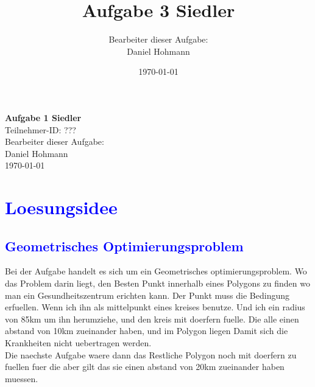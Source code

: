 \documentclass{article}
\title{\Huge{\textbf{Aufgabe 3 Siedler}} \\ \centering{\LARGE{Teilnahme-ID: ?????}}}
\author{Bearbeiter dieser Aufgabe: \\ Daniel Hohmann}
\date{\today}
\begin{document}
\thispagestyle{empty}
\begin{center}
\Huge{\textbf{Aufgabe 1 Siedler}}
\\
\LARGE{Teilnehmer-ID: ???}
\\
\LARGE{Bearbeiter dieser Aufgabe: \\ Daniel Hohmann}
\\
\LARGE{\today}
\end{center}
\newpage
\setcounter{page}{1}
\tableofcontents
\newpage
\section{\textcolor{blue}{Loesungsidee}}
\subsection{\textcolor{blue}{Geometrisches Optimierungsproblem}}
Bei der Aufgabe handelt es sich um ein Geometrisches optimierungsproblem. Wo das Problem darin liegt, den Besten Punkt innerhalb eines Polygons zu finden wo man ein Gesundheitszentrum erichten kann. Der Punkt muss die Bedingung erfuellen. Wenn ich ihn als mittelpunkt eines kreises benutze. Und ich ein radius von 85km um ihn herumziehe, und den kreis mit doerfern fuelle. Die alle einen abstand von 10km zueinander haben, und im Polygon liegen Damit sich die Krankheiten nicht uebertragen werden.
\\
Die naechste Aufgabe waere dann das Restliche Polygon noch mit doerfern zu fuellen fuer die aber gilt das sie einen abstand von 20km zueinander haben muessen.
\end{document}

